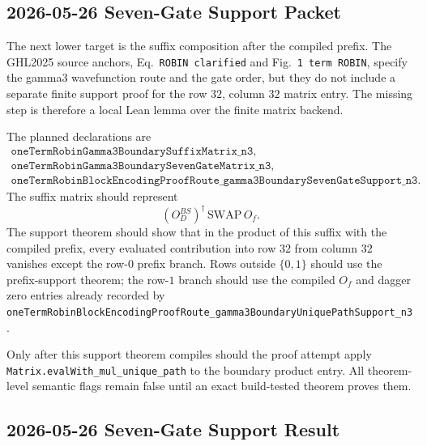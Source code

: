 \subsection{2026-05-26 Seven-Gate Support Packet}

The next lower target is the suffix composition after the compiled prefix.
The GHL2025 source anchors, Eq.~\texttt{ROBIN clarified} and
Fig.~\texttt{1 term ROBIN}, specify the gamma3 wavefunction route and the gate
order, but they do not include a separate finite support proof for the row
\(32\), column \(32\) matrix entry.  The missing step is therefore a local
Lean lemma over the finite matrix backend.

The planned declarations are
\[
\begin{array}{l}
\texttt{oneTermRobinGamma3BoundarySuffixMatrix\_n3},\\
\texttt{oneTermRobinGamma3BoundarySevenGateMatrix\_n3},\\
\texttt{oneTermRobinBlockEncodingProofRoute\_gamma3BoundarySevenGateSupport\_n3}.
\end{array}
\]
The suffix matrix should represent
\[
  (O_D^{BS})^\dagger \,\mathrm{SWAP}\, O_f.
\]
The support theorem should show that in the product of this suffix with the
compiled prefix, every evaluated contribution into row \(32\) from column
\(32\) vanishes except the row-\(0\) prefix branch.  Rows outside
\(\{0,1\}\) should use the prefix-support theorem; the row-\(1\) branch should
use the compiled \(O_f\) and dagger zero entries already recorded by
\texttt{oneTermRobinBlockEncodingProofRoute\_gamma3BoundaryUniquePathSupport\_n3}.

Only after this support theorem compiles should the proof attempt apply
\texttt{Matrix.evalWith\_mul\_unique\_path} to the boundary product entry.
All theorem-level semantic flags remain false until an exact build-tested
theorem proves them.

\subsection{2026-05-26 Seven-Gate Support Result}

